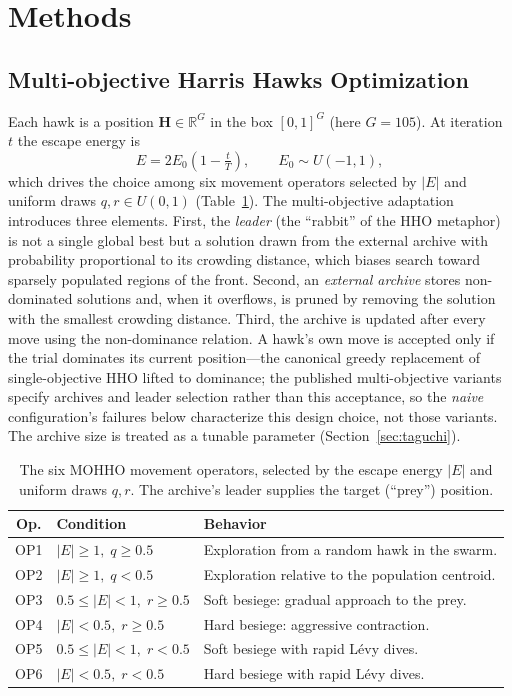 \documentclass[runningheads]{llncs}
\begin{document}
\section{Methods}
\label{sec:methods}

\subsection{Multi-objective Harris Hawks Optimization}
\label{sec:mohho}

Each hawk is a position $\mathbf{H}\in\mathbb{R}^{G}$ in the box $[0,1]^{G}$ (here $G=105$). At iteration $t$ the escape energy is
\begin{equation}
E = 2E_0\!\left(1 - \tfrac{t}{T}\right), \qquad E_0 \sim U(-1,1),
\label{eq:energy}
\end{equation}
which drives the choice among six movement operators selected by $|E|$ and uniform draws $q,r\in U(0,1)$ (Table~\ref{tab:operators}). The multi-objective adaptation introduces three elements. First, the \emph{leader} (the ``rabbit'' of the HHO metaphor) is not a single global best but a solution drawn from the external archive with probability proportional to its crowding distance, which biases search toward sparsely populated regions of the front. Second, an \emph{external archive} stores non-dominated solutions and, when it overflows, is pruned by removing the solution with the smallest crowding distance. Third, the archive is updated after every move using the non-dominance relation. A hawk's own move is accepted only if the trial dominates its current position---the canonical greedy replacement of single-objective HHO lifted to dominance; the published multi-objective variants~\cite{jangir,cerci,kusoglu} specify archives and leader selection rather than this acceptance, so the \emph{naive} configuration's failures below characterize this design choice, not those variants. The archive size is treated as a tunable parameter (Section~\ref{sec:taguchi}).

\begin{table}[t]
\centering
\caption{The six MOHHO movement operators, selected by the escape energy $|E|$ and uniform draws $q,r$. The archive's leader supplies the target (``prey'') position.}
\label{tab:operators}
\small
\begin{tabular}{cll}
\toprule
\textbf{Op.} & \textbf{Condition} & \textbf{Behavior}\\
\midrule
OP1 & $|E|\ge 1,\; q\ge 0.5$ & Exploration from a random hawk in the swarm.\\
OP2 & $|E|\ge 1,\; q< 0.5$ & Exploration relative to the population centroid.\\
OP3 & $0.5\le|E|< 1,\; r\ge 0.5$ & Soft besiege: gradual approach to the prey.\\
OP4 & $|E|< 0.5,\; r\ge 0.5$ & Hard besiege: aggressive contraction.\\
OP5 & $0.5\le|E|< 1,\; r< 0.5$ & Soft besiege with rapid Lévy dives.\\
OP6 & $|E|< 0.5,\; r< 0.5$ & Hard besiege with rapid Lévy dives.\\
\bottomrule
\end{tabular}
\end{table}
\end{document}
